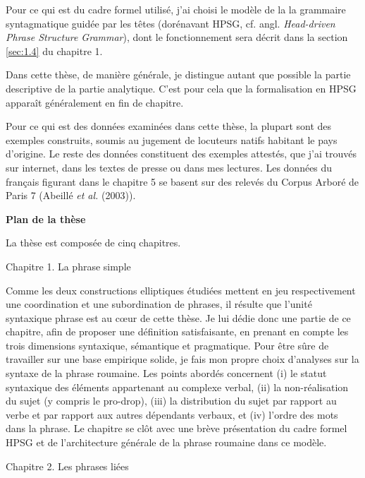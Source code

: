 Pour ce qui est du cadre formel utilisé, j'ai choisi le modèle de la la grammaire syntagmatique guidée par les têtes (dorénavant HPSG, cf. angl. \textit{Head-driven Phrase Structure Grammar}), dont le fonctionnement sera décrit dans la section \ref{sec:1.4} du chapitre 1.

Dans cette thèse, de manière générale, je distingue autant que possible la partie descriptive de la partie analytique. C'est pour cela que la formalisation en HPSG apparaît généralement en fin de chapitre. 

Pour ce qui est des données examinées dans cette thèse, la plupart sont des exemples construits, soumis au jugement de locuteurs natifs habitant le pays d'origine. Le reste des données constituent des exemples attestés, que j'ai trouvés sur internet, dans les textes de presse ou dans mes lectures. Les données du français figurant dans le chapitre 5 se basent sur des relevés du Corpus Arboré de Paris 7 (Abeillé \textit{et al.} (2003)). 

{\bfseries
Plan de la thèse}

La thèse est composée de cinq chapitres.

Chapitre 1. La phrase simple

Comme les deux constructions elliptiques étudiées mettent en jeu respectivement une coordination et une subordination de phrases, il résulte que l'unité syntaxique phrase est au c{\oe}ur de cette thèse. Je lui dédie donc une partie de ce chapitre, afin de proposer une définition satisfaisante, en prenant en compte les trois dimensions syntaxique, sémantique et pragmatique. Pour être sûre de travailler sur une base empirique solide, je fais mon propre choix d'analyses sur la syntaxe de la phrase roumaine. Les points abordés concernent (i) le statut syntaxique des éléments appartenant au complexe verbal, (ii) la non-réalisation du sujet (y compris le pro-drop), (iii) la distribution du sujet par rapport au verbe et par rapport aux autres dépendants verbaux, et (iv) l'ordre des mots dans la phrase. Le chapitre se clôt avec une brève présentation du cadre formel HPSG et de l'architecture générale de la phrase roumaine dans ce modèle.

Chapitre 2. Les phrases liées

